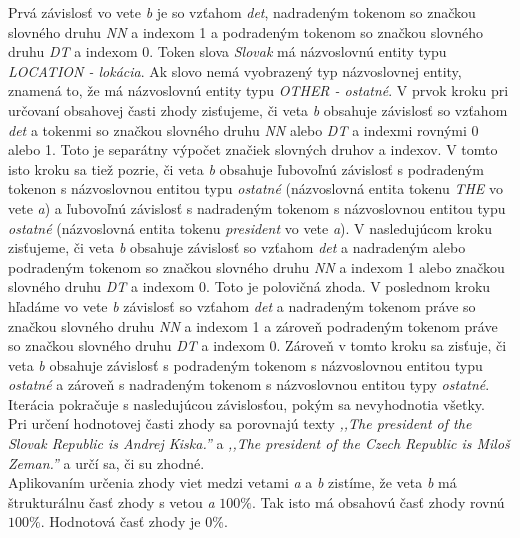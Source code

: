 Prvá závislosť vo vete \textit{b} je so vzťahom \textit{det}, nadradeným tokenom so značkou slovného druhu \textit{NN} a indexom 1 a podradeným tokenom so značkou slovného druhu \textit{DT} a indexom 0. Token slova \textit{Slovak} má názvoslovnú entity typu \textit{LOCATION - lokácia}. Ak slovo nemá vyobrazený typ názvoslovnej entity, znamená to, že má názvoslovnú entity typu \textit{OTHER - ostatné}. V prvok kroku pri určovaní obsahovej časti zhody zisťujeme, či veta \textit{b} obsahuje závislosť so vzťahom \textit{det} a tokenmi so značkou slovného druhu \textit{NN} alebo \textit{DT} a indexmi rovnými 0 alebo 1. Toto je separátny výpočet značiek slovných druhov a indexov. V tomto isto kroku sa tiež pozrie, či veta \textit{b} obsahuje ľubovoľnú závislosť s podradeným tokenon s názvoslovnou entitou typu \textit{ostatné} (názvoslovná entita tokenu \textit{THE} vo vete \textit{a}) a ľubovoľnú závislosť s nadradeným tokenom s názvoslovnou entitou typu \textit{ostatné} (názvoslovná entita tokenu \textit{president} vo vete \textit{a}). V nasledujúcom kroku zisťujeme, či veta \textit{b} obsahuje závislosť so vzťahom \textit{det} a nadradeným alebo podradeným tokenom so značkou slovného druhu \textit{NN} a indexom 1 alebo značkou slovného druhu \textit{DT} a indexom 0. Toto je polovičná zhoda. V poslednom kroku hľadáme vo vete \textit{b} závislosť so vzťahom \textit{det} a nadradeným tokenom práve so značkou slovného druhu \textit{NN} a indexom 1 a zároveň podradeným tokenom práve so značkou slovného druhu \textit{DT} a indexom 0. Zároveň v tomto kroku sa zisťuje, či veta \textit{b} obsahuje závislosť s podradeným tokenom s názvoslovnou entitou typu \textit{ostatné} a zároveň s nadradeným tokenom s názvoslovnou entitou typy \textit{ostatné}. Iterácia pokračuje s nasledujúcou závislosťou, pokým sa nevyhodnotia všetky. \\

Pri určení hodnotovej časti zhody sa porovnajú texty \textit{,,The president of the Slovak Republic is Andrej Kiska.''} a \textit{,,The president of the Czech Republic is Miloš Zeman.''} a určí sa, či su zhodné. \\

Aplikovaním určenia zhody viet medzi vetami \textit{a} a \textit{b} zistíme, že veta \textit{b} má štrukturálnu časť zhody s vetou \textit{a} $100\%$. Tak isto má obsahovú časť zhody rovnú $100\%$. Hodnotová časť zhody je $0\%$.

